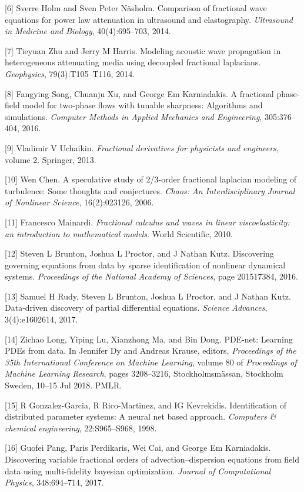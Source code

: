 \documentclass[UTF8]{article}
\begin{document}
[6] Sverre Holm and Sven Peter Näsholm. Comparison of fractional wave equations for power law attenuation in ultrasound and elastography. \textit{Ultrasound in Medicine and Biology}, 40(4):695--703, 2014.

[7] Tieyuan Zhu and Jerry M Harris. Modeling acoustic wave propagation in heterogeneous attenuating media using decoupled fractional laplacians. \textit{Geophysics}, 79(3):T105--T116, 2014.

[8] Fangying Song, Chuanju Xu, and George Em Karniadakis. A fractional phase-field model for two-phase flows with tunable sharpness: Algorithms and simulations. \textit{Computer Methods in Applied Mechanics and Engineering}, 305:376--404, 2016.

[9] Vladimir V Uchaikin. \textit{Fractional derivatives for physicists and engineers}, volume 2. Springer, 2013.

[10] Wen Chen. A speculative study of 2/3-order fractional laplacian modeling of turbulence: Some thoughts and conjectures. \textit{Chaos: An Interdisciplinary Journal of Nonlinear Science}, 16(2):023126, 2006.

[11] Francesco Mainardi. \textit{Fractional calculus and waves in linear viscoelasticity: an introduction to mathematical models}. World Scientific, 2010.

[12] Steven L Brunton, Joshua L Proctor, and J Nathan Kutz. Discovering governing equations from data by sparse identification of nonlinear dynamical systems. \textit{Proceedings of the National Academy of Sciences}, page 201517384, 2016.

[13] Samuel H Rudy, Steven L Brunton, Joshua L Proctor, and J Nathan Kutz. Data-driven discovery of partial differential equations. \textit{Science Advances}, 3(4):e1602614, 2017.

[14] Zichao Long, Yiping Lu, Xianzhong Ma, and Bin Dong. PDE-net: Learning PDEs from data. In Jennifer Dy and Andreas Krause, editors, \textit{Proceedings of the 35th International Conference on Machine Learning}, volume 80 of \textit{Proceedings of Machine Learning Research}, pages 3208--3216, Stockholmsmässan, Stockholm Sweden, 10--15 Jul 2018. PMLR.

[15] R Gonzalez-Garcia, R Rico-Martinez, and IG Kevrekidis. Identification of distributed parameter systems: A neural net based approach. \textit{Computers \& chemical engineering}, 22:S965--S968, 1998.

[16] Guofei Pang, Paris Perdikaris, Wei Cai, and George Em Karniadakis. Discovering variable fractional orders of advection--dispersion equations from field data using multi-fidelity bayesian optimization. \textit{Journal of Computational Physics}, 348:694--714, 2017.
\end{document}
